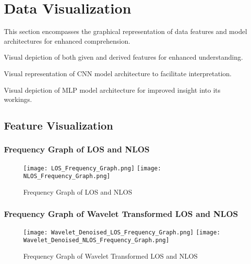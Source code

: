 \documentclass[
	article, %
	11pt, %
	draft, %
]{CSUniSchoolLabReport}
\begin{document}


\section{Data Visualization}\label{data_visualisation}

This section encompasses the graphical representation of data features and model architectures for enhanced comprehension.

\begin{description}[style=nextline]
    \item[Feature Visualization:] Visual depiction of both given and derived features for enhanced understanding.
    \item[Convolution Neural Network:] Visual representation of CNN model architecture to facilitate interpretation.
    \item[Multilayer Perceptron:] Visual depiction of MLP model architecture for improved insight into its workings.
\end{description}

\subsection{Feature Visualization}\label{feature_visualization}

\subsubsection{Frequency Graph of LOS and NLOS}\label{frequency_graph}

\begin{figure}[H] 
	\centering
	\texttt{[image: LOS\_Frequency\_Graph.png]}
	\texttt{[image: NLOS\_Frequency\_Graph.png]}
	\caption{Frequency Graph of LOS and NLOS}\label{fig:frequency_graph}
\end{figure}

\subsubsection{Frequency Graph of Wavelet Transformed LOS and NLOS}\label{frequency_graph_wavelet}

\begin{figure}[H] 
  \centering
  \texttt{[image: Wavelet\_Denoised\_LOS\_Frequency\_Graph.png]}
  \texttt{[image: Wavelet\_Denoised\_NLOS\_Frequency\_Graph.png]}
  \caption{Frequency Graph of Wavelet Transformed LOS and NLOS}\label{fig:frequency_graph_wavelet}
\end{figure}
\end{document}
